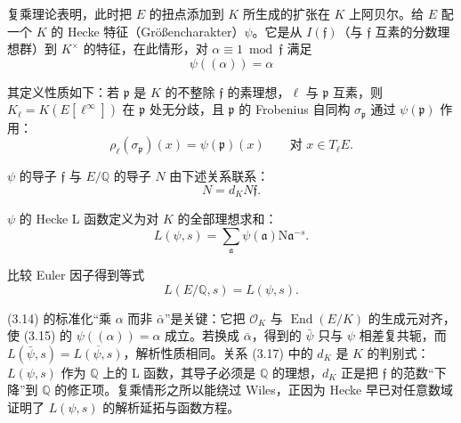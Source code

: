 复乘理论表明，此时把 $E$ 的扭点添加到 $K$ 所生成的扩张在 $K$ 上阿贝尔。给 $E$ 配一个 $K$ 的 Hecke 特征（Größencharakter）$\psi$。它是从 $I(\mathfrak{f})$（与 $\mathfrak{f}$ 互素的分数理想群）到 $K^\times$ 的特征，在此情形，对 $\alpha\equiv1\bmod\mathfrak{f}$ 满足
\begin{equation}\tag{3.15}\label{c5:eq:3.15}
\psi((\alpha))=\alpha
\end{equation}

其定义性质如下：若 $\mathfrak{p}$ 是 $K$ 的不整除 $\mathfrak{f}$ 的素理想，$\ell$ 与 $\mathfrak{p}$ 互素，则 $K_\ell=K(E[\ell^\infty])$ 在 $\mathfrak{p}$ 处无分歧，且 $\mathfrak{p}$ 的 Frobenius 自同构 $\sigma_{\mathfrak{p}}$ 通过 $\psi(\mathfrak{p})$ 作用：
\begin{equation}\tag{3.16}\label{c5:eq:3.16}
\rho_\ell(\sigma_{\mathfrak{p}})(x)=\psi(\mathfrak{p})(x)\qquad\text{对 }x\in T_\ell E.
\end{equation}

$\psi$ 的导子 $\mathfrak{f}$ 与 $E/\mathbb{Q}$ 的导子 $N$ 由下述关系联系：
\begin{equation}\tag{3.17}\label{c5:eq:3.17}
N=d_KN\mathfrak{f}.
\end{equation}

$\psi$ 的 Hecke L 函数定义为对 $K$ 的全部理想求和：
\begin{equation}\tag{3.18}\label{c5:eq:3.18}
L(\psi,s)=\sum_{\mathfrak{a}}\psi(\mathfrak{a})\mathrm{N}\mathfrak{a}^{-s}.
\end{equation}

比较 Euler 因子得到等式
\begin{equation}\tag{3.19}\label{c5:eq:3.19}
L(E/\mathbb{Q},s)=L(\psi,s).
\end{equation}

\begin{annote}
(3.14) 的标准化“乘 $\alpha$ 而非 $\bar\alpha$”是关键：它把 $\mathcal{O}_K$ 与 $\operatorname{End}(E/K)$ 的生成元对齐，使 (3.15) 的 $\psi((\alpha))=\alpha$ 成立。若换成 $\bar\alpha$，得到的 $\bar\psi$ 只与 $\psi$ 相差复共轭，而 $L(\bar\psi,s)=\overline{L(\psi,s)}$，解析性质相同。关系 (3.17) 中的 $d_K$ 是 $K$ 的判别式：$L(\psi,s)$ 作为 $\mathbb{Q}$ 上的 L 函数，其导子必须是 $\mathbb{Q}$ 的理想，$d_K$ 正是把 $\mathfrak{f}$ 的范数“下降”到 $\mathbb{Q}$ 的修正项。复乘情形之所以能绕过 Wiles，正因为 Hecke 早已对任意数域证明了 $L(\psi,s)$ 的解析延拓与函数方程。
\par\vspace{0.15em}{\raggedleft 【来源：Shimura《Introduction to the Arithmetic Theory of Automorphic Forms》第 7 章（A）；Silverman《Advanced Topics in the Arithmetic of Elliptic Curves》第 II 章（A）】\par}
\end{annote}

